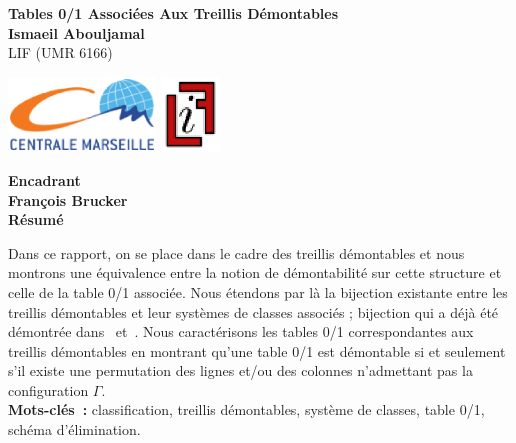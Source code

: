 \documentclass[a4paper]{report}
\renewcommand{\textbf}[1]{\begingroup\bfseries\mathversion{bold}#1\endgroup}
\begin{document}


\def\TitreRapport{
Tables 0/1 Associées Aux Treillis Démontables
}


\def\NomsAuteurs{
Ismaeil Abouljamal
}

\def\DateRapport{
    10 juin 2011
}

\def\Encadrants{
    \textbf{Encadrant} \\
    François Brucker
}
\def\Labo{
    LIF (UMR 6166)
}



\def\ResumeFrancais{
Dans ce rapport, on se place dans le cadre des treillis démontables et nous montrons une équivalence entre la notion de démontabilité sur cette structure et celle
de la table 0/1 associée.
Nous étendons par là la bijection existante entre les treillis démontables et leur systèmes de classes associés ; bijection qui a déjà été démontrée dans~\cite{par_clu} et~\cite{crow_free}.
Nous caractérisons les tables 0/1 correspondantes aux treillis démontables en montrant qu'une table 0/1 est démontable si et seulement s'il existe une permutation 
des lignes et/ou des colonnes n'admettant pas la configuration $\Gamma$. 
    \\[2mm]
    {\bf Mots-clés~: }classification, treillis démontables, système de classes, table 0/1, schéma d'élimination.
}


\thispagestyle{empty}
\begin{center}
\normalbaselineskip
{\bf\Large \TitreRapport}\\[8mm]
{\bf\large \NomsAuteurs}\\[1mm]
{\Labo}\\[4mm]
\begin{center}
\includegraphics[height=2cm]{images/ecm.ps}
\includegraphics[height=2cm]{images/lif.ps}
\end{center}
\Encadrants\\[10mm]

{\bf Résumé}
\end{center}
\ResumeFrancais\\[4mm]
\end{document}
